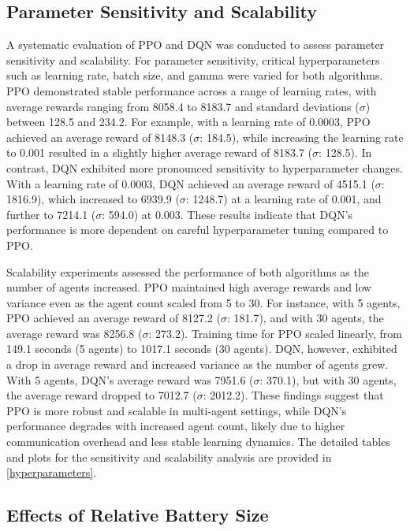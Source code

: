 \documentclass[preprint,12pt]{elsarticle}
\begin{document}
\subsection{Parameter Sensitivity and Scalability}

A systematic evaluation of PPO and DQN was conducted to assess parameter sensitivity and scalability. For parameter sensitivity, critical hyperparameters such as learning rate, batch size, and gamma were varied for both algorithms. PPO demonstrated stable performance across a range of learning rates, with average rewards ranging from 8058.4 to 8183.7 and standard deviations ($\sigma$) between 128.5 and 234.2. For example, with a learning rate of 0.0003, PPO achieved an average reward of 8148.3 ($\sigma$: 184.5), while increasing the learning rate to 0.001 resulted in a slightly higher average reward of 8183.7 ($\sigma$: 128.5). In contrast, DQN exhibited more pronounced sensitivity to hyperparameter changes. With a learning rate of 0.0003, DQN achieved an average reward of 4515.1 ($\sigma$: 1816.9), which increased to 6939.9 ($\sigma$: 1248.7) at a learning rate of 0.001, and further to 7214.1 ($\sigma$: 594.0) at 0.003. These results indicate that DQN’s performance is more dependent on careful hyperparameter tuning compared to PPO.

Scalability experiments assessed the performance of both algorithms as the number of agents increased. PPO maintained high average rewards and low variance even as the agent count scaled from 5 to 30. For instance, with 5 agents, PPO achieved an average reward of 8127.2 ($\sigma$: 181.7), and with 30 agents, the average reward was 8256.8 ($\sigma$: 273.2). Training time for PPO scaled linearly, from 149.1 seconds (5 agents) to 1017.1 seconds (30 agents). DQN, however, exhibited a drop in average reward and increased variance as the number of agents grew. With 5 agents, DQN’s average reward was 7951.6 ($\sigma$: 370.1), but with 30 agents, the average reward dropped to 7012.7 ($\sigma$: 2012.2). These findings suggest that PPO is more robust and scalable in multi-agent settings, while DQN’s performance degrades with increased agent count, likely due to higher communication overhead and less stable learning dynamics. The detailed tables and plots for the sensitivity and scalability analysis are provided in \ref{hyperparameters}.



\subsection{Effects of Relative Battery Size}
\end{document}
